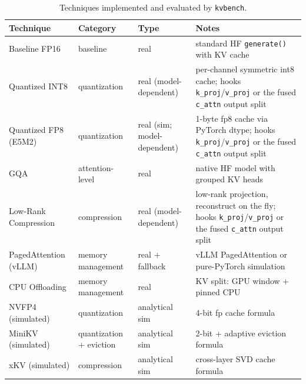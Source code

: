 \documentclass[conference]{IEEEtran}
\begin{document}
\begin{table}[htbp]
	\centering
	\caption{Techniques implemented and evaluated by \texttt{kvbench}.}
	\label{tab:techniques}
	\small
	\begin{tabularx}{\linewidth}{llXX}
		\toprule
		\textbf{Technique}     & \textbf{Category}        & \textbf{Type}                          & \textbf{Notes}                                               \\
		\midrule
		Baseline FP16           & baseline                 & real                                   & standard HF \texttt{generate()} with KV cache               \\
		\midrule
		Quantized INT8          & quantization             & real (model-dependent)               & per-channel symmetric int8 cache; hooks \texttt{k\_proj}/\texttt{v\_proj} or the fused \texttt{c\_attn} output split \\
		\midrule
		Quantized FP8 (E5M2)    & quantization             & real (sim; model-dependent)          & 1-byte fp8 cache via PyTorch dtype; hooks \texttt{k\_proj}/\texttt{v\_proj} or the fused \texttt{c\_attn} output split \\
		\midrule
		GQA                     & attention-level          & real                                   & native HF model with grouped KV heads                       \\
		\midrule
		Low-Rank Compression    & compression              & real (model-dependent)               & low-rank projection, reconstruct on the fly; hooks \texttt{k\_proj}/\texttt{v\_proj} or the fused \texttt{c\_attn} output split \\
		\midrule
		PagedAttention (vLLM)   & memory management        & real + fallback                        & vLLM PagedAttention or pure-PyTorch simulation              \\
		\midrule
		CPU Offloading          & memory management        & real                                   & KV split: GPU window + pinned CPU                            \\
		\midrule
		NVFP4 (simulated)       & quantization             & analytical sim                         & 4-bit fp cache formula                                       \\
		\midrule
		MiniKV (simulated)      & quantization + eviction  & analytical sim                         & 2-bit + adaptive eviction formula                            \\
		\midrule
		xKV (simulated)         & compression              & analytical sim                         & cross-layer SVD cache formula                                \\
		\bottomrule
	\end{tabularx}
\end{table}
\end{document}
